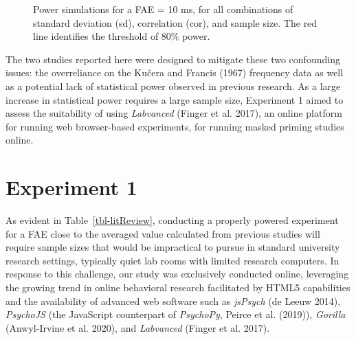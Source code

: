\documentclass[
]{interact}
\begin{document}
\begin{figure}[H]


\caption{\label{fig-power}Power simulations for a FAE = 10 ms, for all
combinations of standard deviation (sd), correlation (cor), and sample
size. The red line identifies the threshold of 80\% power.}

\end{figure}%

The two studies reported here were designed to mitigate these two
confounding issues: the overreliance on the Kučera and Francis (1967)
frequency data as well as a potential lack of statistical power observed
in previous research. As a large increase in statistical power requires
a large sample size, Experiment 1 aimed to assess the suitability of
using \emph{Labvanced} (Finger et al. 2017), an online platform for
running web browser-based experiments, for running masked priming
studies online.

\section{Experiment 1}\label{sec-exp1}

As evident in Table~\ref{tbl-litReview}, conducting a properly powered
experiment for a FAE close to the averaged value calculated from
previous studies will require sample sizes that would be impractical to
pursue in standard university research settings, typically quiet lab
rooms with limited research computers. In response to this challenge,
our study was exclusively conducted online, leveraging the growing trend
in online behavioral research facilitated by HTML5 capabilities and the
availability of advanced web software such as \emph{jsPsych} (de Leeuw
2014), \emph{PsychoJS} (the JavaScript counterpart of \emph{PsychoPy},
Peirce et al. (2019)), \emph{Gorilla} (Anwyl-Irvine et al. 2020), and
\emph{Labvanced} (Finger et al. 2017).
\end{document}
